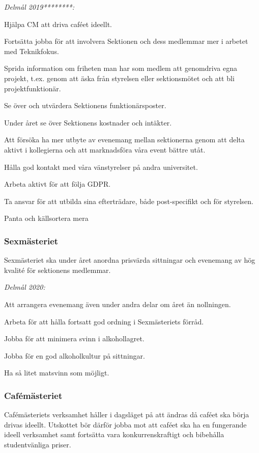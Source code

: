 \documentclass[../_main/handlingar.tex]{subfiles}
\begin{document}
\emph{Delmål 2019********:}
\begin{dashlist}
    \item Hjälpa CM att driva caféet ideellt. 
    \item Fortsätta jobba för att involvera Sektionen och dess medlemmar mer i arbetet med Teknikfokus. 
    \item Sprida information om friheten man har som medlem att genomdriva egna projekt, t.ex. genom att äska från styrelsen eller sektionsmötet och att bli projektfunktionär. 
    \item Se över och utvärdera Sektionens funktionärsposter. 
    \item Under året se över Sektionens kostnader och intäkter. 
    \item Att försöka ha mer utbyte av evenemang mellan sektionerna genom att delta aktivt i kollegierna och att marknadsföra våra event bättre utåt. 
    \item Hålla god kontakt med våra vänstyrelser på andra universitet.
    \item Arbeta aktivt för att följa GDPR.
    \item Ta ansvar för att utbilda sina efterträdare, både post-specifikt och för styrelsen.
    \item Panta och källsortera mera \scalebox{0.5}{\recycle}
\end{dashlist}
\newpage
\subsubsection*{Sexmästeriet}
Sexmästeriet ska under året anordna prisvärda sittningar och evenemang av hög kvalité för sektionens medlemmar. 

\emph{Delmål 2020:}
\begin{dashlist}
	\item Att arrangera evenemang även under andra delar om året än nollningen.
	\item Arbeta för att hålla fortsatt god ordning i Sexmästeriets förråd.
	\item Jobba för att minimera svinn i alkohollagret. 
	\item Jobba för en god alkoholkultur på sittningar.
	\item Ha så litet matsvinn som möjligt. 
\end{dashlist}

\subsubsection*{Cafémästeriet}
Cafémästeriets verksamhet håller i dagsläget på att ändras då caféet ska börja drivas ideellt. Utskottet bör därför jobba mot att caféet ska ha en fungerande ideell verksamhet samt fortsätta vara konkurrenskraftigt och bibehålla studentvänliga priser.
\end{document}
